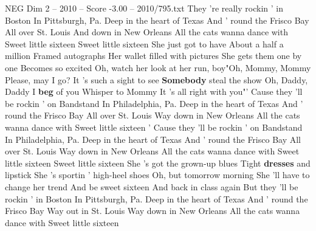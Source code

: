 \begin{textsample}{NEG Dim 2 – 2010 – Score -3.00 – 2010/795.txt}  \label{ex:f2_neg_001}
They 're really rockin ' in Boston In Pittsburgh, Pa.
Deep in the heart of Texas And ' round the Frisco Bay All over St.
Louis And down in New Orleans All the cats wanna dance with Sweet little sixteen Sweet little sixteen She just got to have About a half a million Framed autographs Her wallet filled with pictures She gets them one by one Becomes so excited Oh, watch her look at her run, boy"Oh, Mommy, Mommy Please, may I go?
It 's such a sight to see \textbf{Somebody} steal the show Oh, Daddy, Daddy I \textbf{beg} of you Whisper to Mommy It 's all right with you"' Cause they 'll be rockin ' on Bandstand In Philadelphia, Pa.
Deep in the heart of Texas And ' round the Frisco Bay All over St.
Louis Way down in New Orleans All the cats wanna dance with Sweet little sixteen ' Cause they 'll be rockin ' on Bandstand In Philadelphia, Pa.
Deep in the heart of Texas And ' round the Frisco Bay All over St.
Louis Way down in New Orleans All the cats wanna dance with Sweet little sixteen Sweet little sixteen She 's got the grown-up blues Tight \textbf{dresses} and lipstick She 's sportin ' high-heel shoes Oh, but tomorrow morning She 'll have to change her trend And be sweet sixteen And back in class again But they 'll be rockin ' in Boston In Pittsburgh, Pa.
Deep in the heart of Texas And ' round the Frisco Bay Way out in St.
Louis Way down in New Orleans All the cats wanna dance with Sweet little sixteen

\end{textsample}
